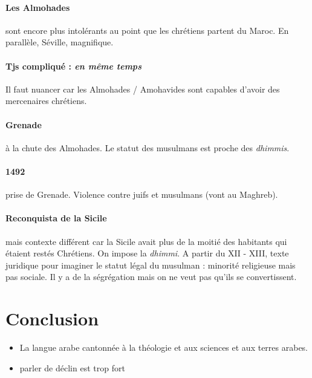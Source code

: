 \paragraph{Les Almohades} sont encore plus intolérants au point que les chrétiens partent du Maroc. En parallèle, Séville, magnifique.

\paragraph{Tjs compliqué : \textit{en même temps}} Il faut nuancer car les Almohades / Amohavides sont capables d'avoir des mercenaires chrétiens. 

\paragraph{Grenade} à la chute des Almohades. Le statut des musulmans est proche des \textit{dhimmis}. 

\paragraph{1492} prise de Grenade. Violence contre juifs et musulmans (vont au Maghreb).

\paragraph{Reconquista de la Sicile} mais contexte différent car la Sicile avait plus de la moitié des habitants qui étaient restés Chrétiens. On impose la \textit{dhimmi}. A partir du XII - XIII, texte juridique pour imaginer le statut légal du musulman : minorité religieuse mais pas sociale. Il y a de la ségrégation mais on ne veut pas qu'ils se convertissent. 


\section{Conclusion}

\begin{Synthesis}
\begin{itemize}
    \item La langue arabe cantonnée à la théologie et aux sciences et aux terres arabes.
\item parler de déclin est trop fort
\end{itemize}

\end{Synthesis}